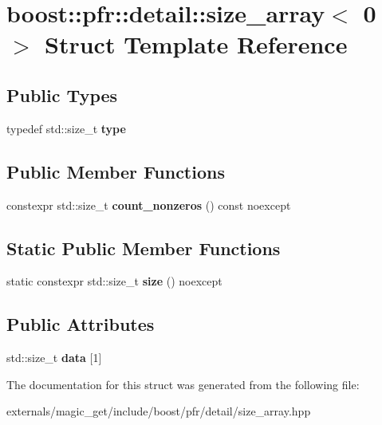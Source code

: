 \hypertarget{structboost_1_1pfr_1_1detail_1_1size__array_3_010_01_4}{}\section{boost\+:\+:pfr\+:\+:detail\+:\+:size\+\_\+array$<$ 0 $>$ Struct Template Reference}
\label{structboost_1_1pfr_1_1detail_1_1size__array_3_010_01_4}
\subsection*{Public Types}
\begin{DoxyCompactItemize}
\item 
\mbox{\label{structboost_1_1pfr_1_1detail_1_1size__array_3_010_01_4_a8266020c5b2e6694c1ac1a403f66122b}} 
typedef std\+::size\+\_\+t {\bfseries type}
\end{DoxyCompactItemize}
\subsection*{Public Member Functions}
\begin{DoxyCompactItemize}
\item 
\mbox{\label{structboost_1_1pfr_1_1detail_1_1size__array_3_010_01_4_a219b593ce6b25f41e820f9a2d4361b9e}} 
constexpr std\+::size\+\_\+t {\bfseries count\+\_\+nonzeros} () const noexcept
\end{DoxyCompactItemize}
\subsection*{Static Public Member Functions}
\begin{DoxyCompactItemize}
\item 
\mbox{\label{structboost_1_1pfr_1_1detail_1_1size__array_3_010_01_4_ab190f8ac8aa522b12138b0268662623a}} 
static constexpr std\+::size\+\_\+t {\bfseries size} () noexcept
\end{DoxyCompactItemize}
\subsection*{Public Attributes}
\begin{DoxyCompactItemize}
\item 
\mbox{\label{structboost_1_1pfr_1_1detail_1_1size__array_3_010_01_4_a6e13578cf59bf438c8d83daa52f99838}} 
std\+::size\+\_\+t {\bfseries data} \mbox{[}1\mbox{]}
\end{DoxyCompactItemize}


The documentation for this struct was generated from the following file\+:\begin{DoxyCompactItemize}
\item 
externals/magic\+\_\+get/include/boost/pfr/detail/size\+\_\+array.\+hpp\end{DoxyCompactItemize}
